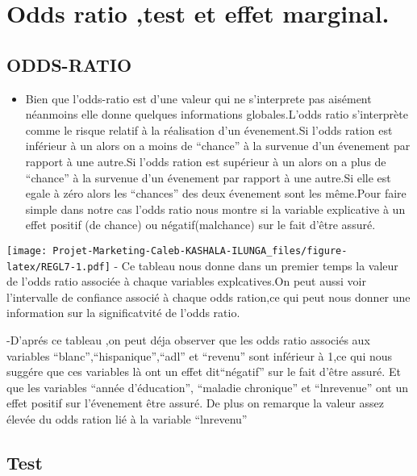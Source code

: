 \documentclass[
  14pt,
  french,
]{article}
\providecommand{\tightlist}{%
  \setlength{\itemsep}{0pt}\setlength{\parskip}{0pt}}
\begin{document}
\hypertarget{odds-ratio-test-et-effet-marginal.}{%
\section{Odds ratio ,test et effet
marginal.}\label{odds-ratio-test-et-effet-marginal.}}

\hypertarget{odds-ratio}{%
\subsection{ODDS-RATIO}\label{odds-ratio}}

\begin{itemize}
\tightlist
\item
  Bien que l'odds-ratio est d'une valeur qui ne s'interprete pas
  aisément néanmoins elle donne quelques informations globales.L'odds
  ratio s'interprète comme le risque relatif à la réalisation d'un
  évenement.Si l'odds ration est inférieur à un alors on a moins de
  ``chance'' à la survenue d'un évenement par rapport à une autre.Si
  l'odds ration est supérieur à un alors on a plus de ``chance'' à la
  survenue d'un évenement par rapport à une autre.Si elle est egale à
  zéro alors les ``chances'' des deux évenement sont les même.Pour faire
  simple dans notre cas l'odds ratio nous montre si la variable
  explicative à un effet positif (de chance) ou négatif(malchance) sur
  le fait d'être assuré.
\end{itemize}

\texttt{[image: Projet-Marketing-Caleb-KASHALA-ILUNGA\_files/figure-latex/REGL7-1.pdf]}
- Ce tableau nous donne dans un premier temps la valeur de l'odds ratio
associée à chaque variables explcatives.On peut aussi voir l'intervalle
de confiance associé à chaque odds ration,ce qui peut nous donner une
information sur la significatvité de l'odds ratio.

-D'aprés ce tableau ,on peut déja observer que les odds ratio associés
aux variables ``blanc'',``hispanique'',``adl'' et ``revenu'' sont
inférieur à 1,ce qui nous suggére que ces variables là ont un effet
dit``négatif'' sur le fait d'être assuré. Et que les variables ``année
d'éducation'', ``maladie chronique'' et ``lnrevenue'' ont un effet
positif sur l'évenement être assuré. De plus on remarque la valeur assez
élevée du odds ration lié à la variable ``lnrevenu''

\hypertarget{test-1}{%
\subsection{Test}\label{test-1}}
\end{document}
